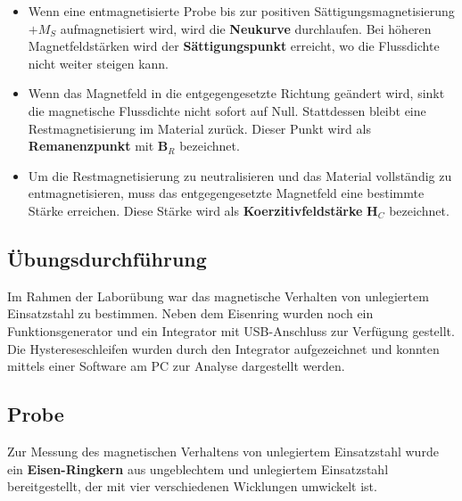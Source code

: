 \documentclass[a4paper,twoside,12pt,DIV=13,BCOR=5mm,numbers=noenddot,cleardoublepage=empty]{scrbook}
\begin{document}
    \begin{itemize}
        \item Wenn eine entmagnetisierte Probe bis zur positiven Sättigungsmagnetisierung $+M_S$ aufmagnetisiert wird, wird die \textbf{Neukurve} durchlaufen. Bei höheren Magnetfeldstärken wird der \textbf{Sättigungspunkt} erreicht, wo die Flussdichte nicht weiter steigen kann.
        \item Wenn das Magnetfeld in die entgegengesetzte Richtung geändert wird, sinkt die magnetische Flussdichte nicht sofort auf Null. Stattdessen bleibt eine Restmagnetisierung im Material zurück. Dieser Punkt wird als \textbf{Remanenzpunkt} mit \textbf{B$_R$} bezeichnet.
        \item Um die Restmagnetisierung zu neutralisieren und das Material vollständig zu entmagnetisieren, muss das entgegengesetzte Magnetfeld eine bestimmte Stärke erreichen. Diese Stärke wird als \textbf{Koerzitivfeldstärke} \textbf{H$_C$} bezeichnet. \\
    \end{itemize}
    
    \subsection{Übungsdurchführung}
    
    Im Rahmen der Laborübung war das magnetische Verhalten von unlegiertem Einsatzstahl zu bestimmen. Neben dem Eisenring wurden noch ein Funktionsgenerator und ein Integrator mit USB-Anschluss zur Verfügung gestellt. Die Hystereseschleifen wurden durch den Integrator aufgezeichnet und konnten mittels einer Software am PC zur Analyse dargestellt werden.
    
    \subsection{Probe}

    Zur Messung des magnetischen Verhaltens von unlegiertem Einsatzstahl wurde ein \textbf{Eisen-Ringkern} aus ungeblechtem und unlegiertem Einsatzstahl bereitgestellt, der mit vier verschiedenen Wicklungen umwickelt ist.
\end{document}
